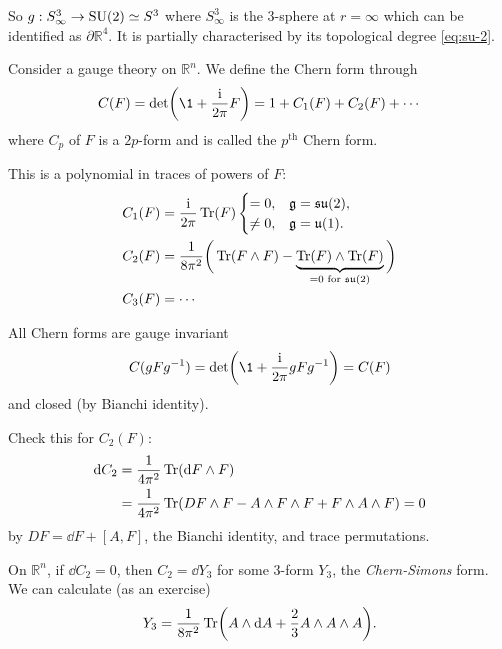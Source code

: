 \documentclass[a4paper,11pt]{article}
\begin{document}
    So $g: S^3_{\infty} \to \operatorname{SU}(2) \simeq S^3$ where $S^3_{\infty}$ is the 3-sphere at $r=\infty$ which can be identified as $\partial \mathbb{R}^4$. It is partially characterised by its topological degree \eqref{eq:su-2}. 

    \begin{rmk}
        Consider a gauge theory on $\mathbb{R}^n$. We define the Chern form through 
        \begin{equation}
            C(F) = \det(\1 + \frac{\mathrm{i}}{2 \pi} F) = 1 + C_1(F) + C_2(F) + \cdots 
        \end{equation}
        where $C_p$ of $F$ is a $2p$-form and is called the $p^{\text{th}}$ Chern form.

        This is a polynomial in traces of powers of $F$: 
        \begin{equation}
            \begin{split}
                C_1(F) & = \frac{\mathrm{i}}{2 \pi} \Tr(F) \begin{cases}
                    = 0, & \mathfrak{g} = \mathfrak{su}(2),\\
                    \neq 0, & \mathfrak{g} = \mathfrak{u}(1).
                \end{cases}\\
                C_2(F) & = \frac{1}{8 \pi^2}\bigg( \Tr(F \wedge F) - \underbrace{\Tr(F) \wedge \Tr(F)}_{=0 \text{ for }\mathfrak{su}(2)} \bigg)\\
                C_3(F) & = \cdots
            \end{split}
        \end{equation}

        All Chern forms are gauge invariant 
        \begin{equation}
            C(g F g^{-1}) = \det(\1 + \frac{\mathrm{i}}{2 \pi} g F g^{-1}) = C(F)
        \end{equation}
        and closed (by Bianchi identity).

        Check this for $C_2(F)$: 
        \begin{equation}
            \begin{split}
                \dd{C_2} & = \frac{1}{4 \pi^2} \Tr(\dd{F} \wedge F)\\
                & = \frac{1}{4 \pi^2} \Tr(D F \wedge F - A \wedge F \wedge F + F \wedge A \wedge F) = 0
            \end{split}
        \end{equation}
        by $DF = \dd{F} + [A,F]$, the Bianchi identity, and trace permutations.

        On $\mathbb{R}^n$, if $\dd{C_2} = 0$, then $C_2 = \dd{Y_3}$ for some $3$-form $Y_3$, the \emph{Chern-Simons} form. We can calculate (as an exercise) 
        \begin{equation}
            Y_3 = \frac{1}{8 \pi^2} \Tr(A \wedge \dd{A} + \frac{2}{3} A \wedge A \wedge A).
        \end{equation}
    \end{rmk} 
\end{document}
